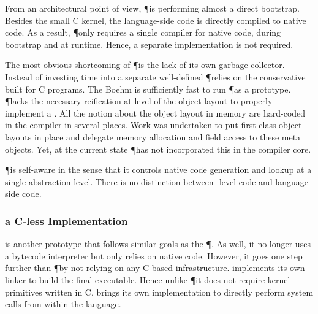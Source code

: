 From an architectural point of view, \P is performing almost a direct bootstrap.
Besides the small C kernel, the language-side code is directly compiled to native code.
As a result, \P only requires a single compiler for native code, during bootstrap and at runtime.
Hence, a separate \JIT implementation is not required.

The most obvious shortcoming of \P is the lack of its own garbage collector.
Instead of investing time into a separate well-defined \GC \P relies on the conservative  built for C programs.
The Boehm \GC is sufficiently fast to run \P as a prototype.
\P lacks the necessary reification at level of the object layout to properly implement a \GC.
All the notion about the object layout in memory are hard-coded in the compiler in several places.
Work was undertaken to put first-class object layouts in place and delegate memory allocation and field access to these meta objects.
Yet, at the current state \P has not incorporated this in the compiler core.

\P is self-aware in the sense that it controls  native code generation and lookup at a single abstraction level.
There is no distinction between \VM-level code and language-side code.


\subsubsection*{\MIST a C-less \ST Implementation}
 is another prototype \ST \VM that follows similar goals as the \P \VM.
As well, it no longer uses a bytecode interpreter but only relies on native code.
However, it goes one step further than \P by not relying on any C-based infrastructure.
\MIST implements its own linker to build the final executable.
Hence unlike \P it does not require kernel primitives written in C.
\MIST brings its own implementation to directly perform system calls from within the language.

\subsubsection*{\Klein \VM}

